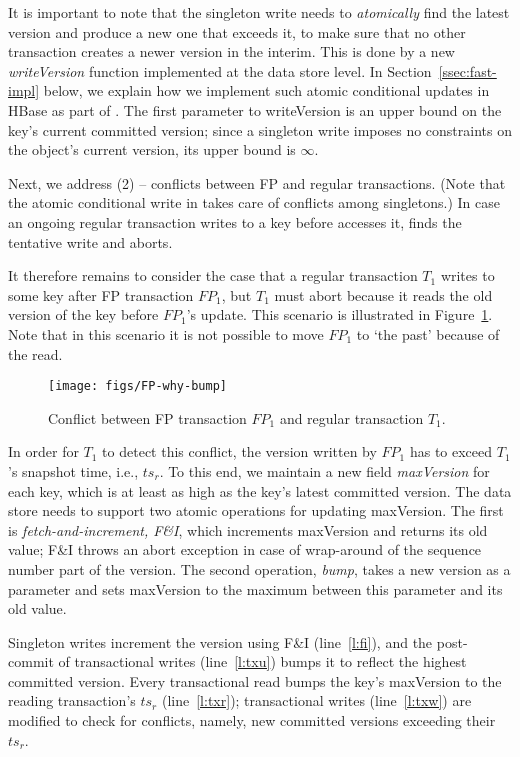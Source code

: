 It is important to note that the singleton write needs to \emph{atomically} find the latest version and produce a new one that exceeds it, 
to make sure that no other transaction creates a newer version in the interim. This is done by a new \emph{writeVersion} function implemented 
at the data store level. In Section~\ref{ssec:fast-impl}
below, we explain how we implement such atomic conditional updates in HBase as part of \sys. 
The first parameter to writeVersion is an upper bound on the key's current committed version; since a singleton write
imposes no constraints on the object's current version, its upper bound is $\infty$.

Next, we address (2) -- conflicts between FP and regular transactions.
(Note that the atomic conditional write in  takes care of conflicts among singletons.)
In case an ongoing regular transaction writes to a key before  accesses it, 
 finds the tentative write and aborts. 

It therefore remains to consider the case that
a regular transaction $T_1$ writes to some key after FP transaction $FP_1$, but $T_1$ must abort because
it reads the old version of the key before $FP_1$'s update. This scenario is illustrated in Figure~\ref{fig:why-bump}. 
Note that in this scenario it is not possible to move $FP_1$ to `the past' because of the read.

\begin{figure}[htb]
\texttt{[image: figs/FP-why-bump]}
\caption{Conflict between FP transaction $FP_1$ and regular transaction $T_1$.}
\label{fig:why-bump}
\end{figure}

In order for $T_1$ to detect this 
conflict, the version written by $FP_1$ has to exceed $T_1$'s snapshot time, i.e., $ts_r$.
To this end, we maintain a new field \emph{maxVersion} for each key, which is at least as 
high as the key's latest committed version. 
The data store needs to support two atomic operations for updating {maxVersion}.
The first is \emph{fetch-and-increment, F\&I}, which increments {maxVersion} and returns its
old value; F\&I throws an abort exception in case of wrap-around of the 
sequence number part  of  the version. 
The second operation, \emph{bump}, takes a new version  as a parameter and
sets  {maxVersion} to the maximum between this parameter and its old value.

Singleton writes  increment the version using F\&I  (line~\ref{l:fi}), and  
the post-commit of transactional writes  (line~\ref{l:txu}) bumps it 
to reflect the highest committed version.
Every transactional read bumps the key's {maxVersion}
to the reading transaction's $ts_r$  (line~\ref{l:txr}); 
transactional writes (line~\ref{l:txw}) are modified to check for conflicts, namely, 
new committed versions exceeding their $ts_r$.

